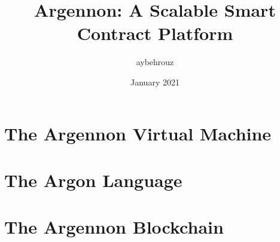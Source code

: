 \documentclass[11pt, a4paper]{report}
\title{Argennon: A Scalable Smart Contract Platform}
\author{aybehrouz}
\date{January 2021}
\begin{document}
    \tableofcontents


    \chapter{The Argennon Virtual Machine}\label{ch:AVM}
    


    \chapter{The Argon Language}\label{ch:argon-lang}
    


    \chapter{The Argennon Blockchain}\label{ch:argennon-blockchain}
    
\end{document}
